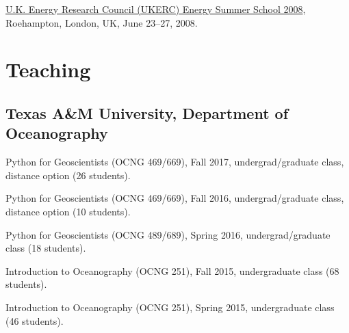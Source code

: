 \documentclass[10pt,letterpaper]{article}
\renewenvironment{itemize}{
  \begin{list}{}{
    \setlength{\leftmargin}{1.5em}
    \setlength{\itemsep}{0.25em}
    \setlength{\parskip}{0pt}
    \setlength{\parsep}{0.25em}
  }
}{
  \end{list}
}
\begin{document}
\begin{itemize}


\item \href{http://www.ukerc.ac.uk/support/tiki-index.php?page=0608UKERCSummerSchool}{U.K. Energy Research Council (UKERC) Energy Summer School 2008},
  Roehampton, London, UK,
  June 23--27, 2008.

\end{itemize}

\section*{Teaching}

\subsection*{Texas A\&M University, Department of Oceanography}

\begin{itemize}

\item Python for Geoscientists (OCNG 469/669), Fall 2017, undergrad/graduate class, distance option (26 students).
\item Python for Geoscientists (OCNG 469/669), Fall 2016, undergrad/graduate class, distance option (10 students).
\item Python for Geoscientists (OCNG 489/689), Spring 2016, undergrad/graduate class (18 students).
\item Introduction to Oceanography (OCNG 251), Fall 2015, undergraduate class (68 students).
\item Introduction to Oceanography (OCNG 251), Spring 2015, undergraduate class (46 students).

\end{itemize}
\end{document}
